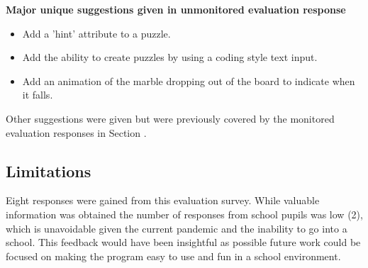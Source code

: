 \documentclass{l4proj}
\begin{document}
\textbf{Major unique suggestions given in unmonitored evaluation response}
\begin{itemize}
    \item Add a 'hint' attribute to a puzzle.
    \item Add the ability to create puzzles by using a coding style text input.
    \item Add an animation of the marble dropping out of the board to indicate when it falls.
\end{itemize}


Other suggestions were given but were previously covered by the monitored evaluation responses in Section .

\subsection{Limitations}


Eight responses were gained from this evaluation survey. While valuable information was obtained the number of responses from school pupils was low (2), which is unavoidable given the current pandemic and the inability to go into a school. This feedback would have been insightful as possible future work could be focused on making the program easy to use and fun in a school environment.  
\end{document}
